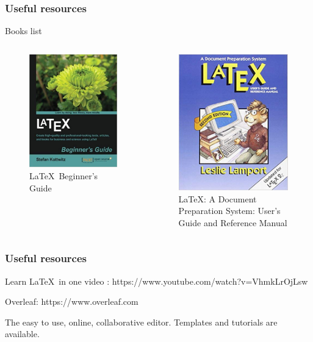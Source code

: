 \documentclass[11pt]{beamer}
\begin{document}
\begin{frame}
	\frametitle{Useful resources}

	Books list
	 \begin{columns}
		\centering
		\begin{figure}
			\includegraphics[width=.5\linewidth]{Figures/BeginnersGuide.jpg}
			\caption{\LaTeX \ Beginner's Guide}
		\end{figure}
		\centering
		\begin{figure}
			\includegraphics[width=.5\linewidth]{Figures/Lamport.jpg}
			\caption{\LaTeX: A Document Preparation System: User's Guide and Reference Manual}
		\end{figure}
	\end{columns}
\end{frame}

\begin{frame}
	\frametitle{Useful resources}

	Learn \LaTeX \ in one video : https://www.youtube.com/watch?v=VhmkLrOjLsw
	
	\bigskip
	
	Overleaf: https://www.overleaf.com
	
	The easy to use, online, collaborative editor. Templates and tutorials are available.

\end{frame}
\end{document}
